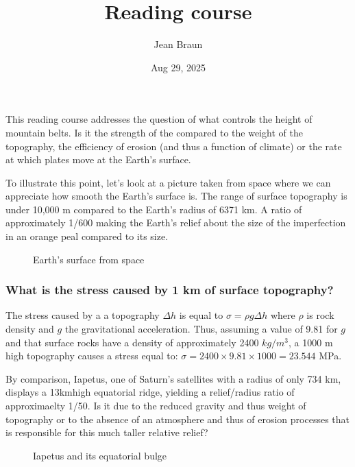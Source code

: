 \documentclass[letterpaper,10pt,english]{jupyterBook}
\title{Reading course}
\date{Aug 29, 2025}
\author{Jean Braun}
\let\sphinxpxdimen\pdfpxdimen\else\newdimen\sphinxpxdimen
\begin{document}
\pagestyle{empty}
\sphinxmaketitle
\pagestyle{plain}
\sphinxtableofcontents
\pagestyle{normal}
\label{\detokenize{intro::doc}}


\sphinxAtStartPar
This reading course addresses the question of what controls the height of mountain belts. Is it the strength of the  compared to the weight of the topography, the efficiency of erosion (and thus a function of climate) or the rate at which plates move at the Earth’s surface.

\sphinxAtStartPar
To illustrate this point, let’s look at a picture taken from space where we can appreciate how smooth the Earth’s surface is. The range of surface topography is under 10,000 m compared to the Earth’s radius of 6371 km. A ratio of approximately 1/600 making the Earth’s relief about the size of the imperfection in an orange peal compared to its size.

\begin{figure}[htbp]
\centering
\capstart

\noindent\sphinxincludegraphics[height=150\sphinxpxdimen]{{fromspace}.png}
\caption{Earth’s surface from space}\label{\detokenize{intro:smooth-earth}}\end{figure}
\subsubsection*{What is the stress caused by 1 km of surface topography?}

\sphinxAtStartPar
The stress caused by a a topography \(\Delta h\) is equal to \(\sigma=\rho g \Delta h\) where \(\rho\) is rock density and \(g\) the gravitational acceleration. Thus, assuming a value of 9.81 for \(g\) and that surface rocks have a density of approximately 2400 \(kg/m^3\), a 1000 m high topography causes a stress equal to:
\(\sigma = 2400\times 9.81 \times 1000 = 23.544\) MPa.

\sphinxAtStartPar
By comparison, Iapetus, one of Saturn’s satellites with a radius of only 734 km, displays a 13km\sphinxhyphen{}high equatorial ridge, yielding a relief/radius ratio of approximaelty 1/50. Is it due to the reduced gravity and thus weight of topography or to the absence of an atmosphere and thus of erosion processes that is responsible for this much taller relative relief?

\begin{figure}[htbp]
\centering
\capstart

\noindent\sphinxincludegraphics[height=150\sphinxpxdimen]{{iapetus}.png}
\caption{Iapetus and its equatorial bulge}\label{\detokenize{intro:iapetus}}\end{figure}
\end{document}
